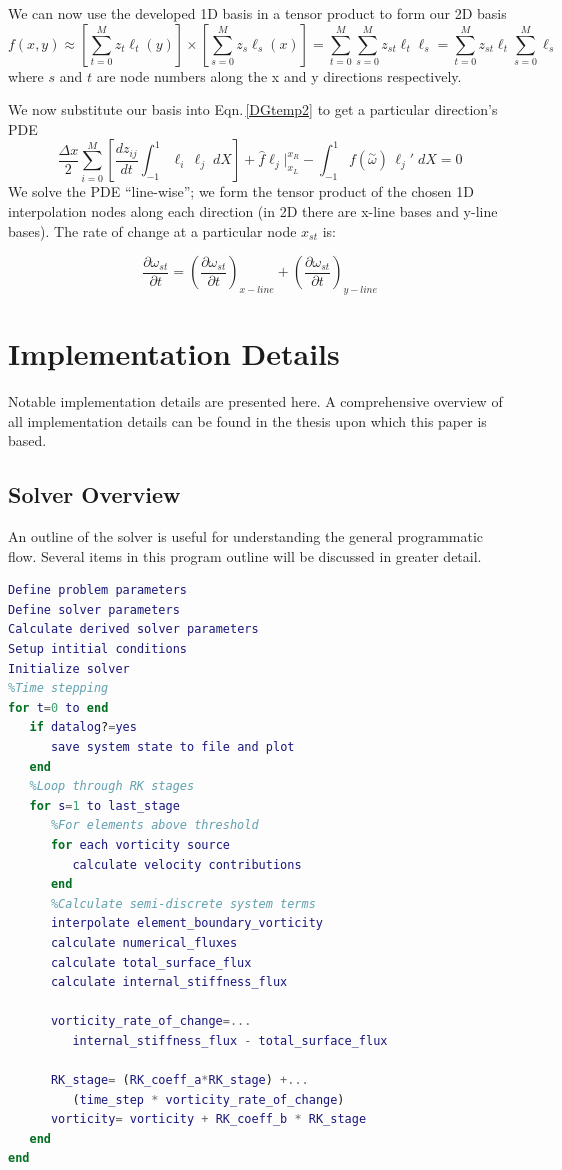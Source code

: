 \documentclass[]{aiaa-tc}%
\newcommand{\be}{\begin{equation}}
\newcommand{\ben}[1]{\begin{equation}\label{#1}}
\newcommand{\ee}{\end{equation}}
\newcommand{\aomega}{\overset{\sim}{\omega}}				%
\begin{document}
We can now use the developed 1D basis in a tensor product to form our 2D basis
\be f(x,y) \approx \left[\sum_{t=0}^M z_t \ell_t(y) \right] \times \left[ \sum_{s=0}^M z_s \ell_s(x) \right] = \sum_{t=0}^M \sum_{s=0}^M z_{st} \ell_t \ell_s =  \sum_{t=0}^M z_{st} \ell_t \sum_{s=0}^M  \ell_s \ee
where $s$ and $t$ are node numbers along the x and y directions respectively.

We now substitute our basis into Eqn.\,\eqref{DGtemp2} to get a particular direction's PDE
\ben{DGJoshTemp} \frac{\Delta x}{2}	\sum_{i=0}^M \left[ \frac{d z_{ij}}{dt}	\int_{-1}^{1}\ell_i  \, \ell_j \;dX \right]
+\hat{f}\ell_j \Big|^{x_R}_{x_L} 
- \int_{-1}^{1} f(\aomega) \, \ell_j' \;dX = 0 \ee
We solve the PDE ``line-wise''; we form the tensor product of the chosen 1D interpolation nodes along each direction (in 2D there are x-line bases and y-line bases). The rate of change at a particular node $x_{st}$ is:

\be \frac{\partial \omega_{st}}{\partial t} = (\frac{\partial \omega_{st}}{\partial t})_{x-line} + (\frac{\partial \omega_{st}}{\partial t})_{y-line} \ee

\section{Implementation Details}
Notable implementation details are presented here. A comprehensive overview of all implementation details can be found in the thesis\cite{Bevan} upon which this paper is based.

\subsection{Solver Overview}
An outline of the solver is useful for understanding the general programmatic flow. Several items in this program outline will be discussed in greater detail.

\begin{lstlisting}[language=Matlab]
Define problem parameters
Define solver parameters
Calculate derived solver parameters
Setup intitial conditions
Initialize solver
%Time stepping
for t=0 to end
   if datalog?=yes
      save system state to file and plot
   end
   %Loop through RK stages
   for s=1 to last_stage
      %For elements above threshold
      for each vorticity source
         calculate velocity contributions
      end
      %Calculate semi-discrete system terms
      interpolate element_boundary_vorticity
      calculate numerical_fluxes
      calculate total_surface_flux
      calculate internal_stiffness_flux
		
      vorticity_rate_of_change=...
         internal_stiffness_flux - total_surface_flux
		
      RK_stage= (RK_coeff_a*RK_stage) +...
         (time_step * vorticity_rate_of_change)
      vorticity= vorticity + RK_coeff_b * RK_stage
   end
end
\end{lstlisting}
\end{document}
